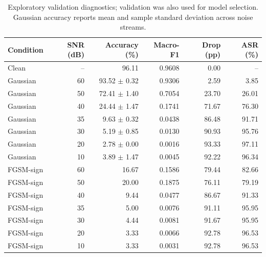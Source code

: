 \begin{table}[t]
\centering
\caption{Exploratory validation diagnostics; validation was also used for model selection. Gaussian accuracy reports mean and sample standard deviation across noise streams.}
\label{tab:val_results}
\begin{tabular}{lrrrrr}
\hline
Condition & SNR (dB) & Accuracy (\%) & Macro-F1 & Drop (pp) & ASR (\%) \\
\hline
Clean & -- & 96.11 & 0.9608 & 0.00 & -- \\
Gaussian & 60 & 93.52 $\pm$ 0.32 & 0.9306 & 2.59 & 3.85 \\
Gaussian & 50 & 72.41 $\pm$ 1.40 & 0.7054 & 23.70 & 26.01 \\
Gaussian & 40 & 24.44 $\pm$ 1.47 & 0.1741 & 71.67 & 76.30 \\
Gaussian & 35 & 9.63 $\pm$ 0.32 & 0.0438 & 86.48 & 91.71 \\
Gaussian & 30 & 5.19 $\pm$ 0.85 & 0.0130 & 90.93 & 95.76 \\
Gaussian & 20 & 2.78 $\pm$ 0.00 & 0.0016 & 93.33 & 97.11 \\
Gaussian & 10 & 3.89 $\pm$ 1.47 & 0.0045 & 92.22 & 96.34 \\
FGSM-sign & 60 & 16.67 & 0.1586 & 79.44 & 82.66 \\
FGSM-sign & 50 & 20.00 & 0.1875 & 76.11 & 79.19 \\
FGSM-sign & 40 & 9.44 & 0.0477 & 86.67 & 91.33 \\
FGSM-sign & 35 & 5.00 & 0.0076 & 91.11 & 95.95 \\
FGSM-sign & 30 & 4.44 & 0.0081 & 91.67 & 95.95 \\
FGSM-sign & 20 & 3.33 & 0.0066 & 92.78 & 96.53 \\
FGSM-sign & 10 & 3.33 & 0.0031 & 92.78 & 96.53 \\
\hline
\end{tabular}
\end{table}
